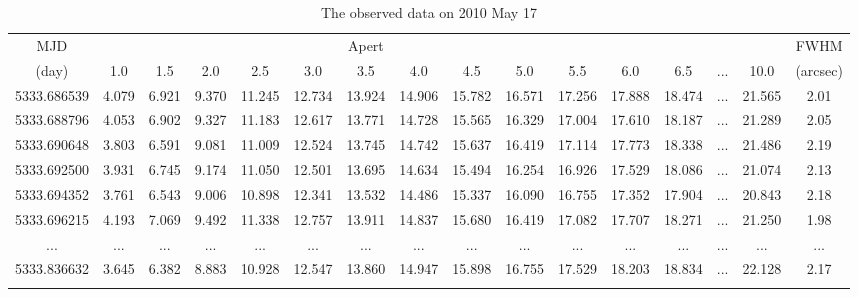 \documentclass[structabstract]{raa}
\begin{document}
\begin{table}
\begin{center}
\begin{minipage}[]{100mm}
\caption[]{The observed data on 2010 May 17}
\label{Table4}
 \end{minipage}
 \setlength{\tabcolsep}{2.5pt}
\small
\begin{tabular}{cccccccccccccccc}
\hline\noalign{\smallskip}
  MJD  &   &   &   &  & &  Apert &    &    &   &  & &   &   &   &  FWHM  \\ \cline{2-15}

  (day)  &1.0  & 1.5  &2.0   & 2.5 &  3.0  & 3.5   & 4.0  & 4.5   &5.0   &5.5 & 6.0 & 6.5 & ...  & 10.0& (arcsec)  \\

\hline\noalign{\smallskip}
5333.686539  & 4.079  & 6.921  & 9.370  &11.245  &12.734  &13.924  &14.906  &15.782  &16.571  &17.256  &17.888  &18.474  & ...  &21.565  & 2.01  \\
5333.688796  & 4.053  & 6.902  & 9.327  &11.183  &12.617  &13.771  &14.728  &15.565  &16.329  &17.004  &17.610  &18.187  & ...  &21.289  & 2.05  \\
5333.690648  & 3.803  & 6.591  & 9.081  &11.009  &12.524  &13.745  &14.742  &15.637  &16.419  &17.114  &17.773  &18.338  & ...  &21.486  & 2.19  \\
5333.692500  & 3.931  & 6.745  & 9.174  &11.050  &12.501  &13.695  &14.634  &15.494  &16.254  &16.926  &17.529  &18.086  & ...  &21.074  & 2.13  \\
5333.694352  & 3.761  & 6.543  & 9.006  &10.898  &12.341  &13.532  &14.486  &15.337  &16.090  &16.755  &17.352  &17.904  & ...  &20.843  & 2.18  \\
5333.696215  & 4.193  & 7.069  & 9.492  &11.338  &12.757  &13.911  &14.837  &15.680  &16.419  &17.082  &17.707  &18.271  & ...  &21.250  & 1.98  \\
 ...         & ...    & ...    & ...    & ...    & ...    & ...    & ...    & ...    & ...    & ...    & ...    & ...    & ...  & ...    & ...   \\
5333.836632  & 3.645  & 6.382  & 8.883  &10.928  &12.547  &13.860  &14.947  &15.898  &16.755  &17.529  &18.203  &18.834  & ...  &22.128  & 2.17 \\
\noalign{\smallskip}\hline
\end{tabular}
\end{center}
\end{table}
\end{document}
